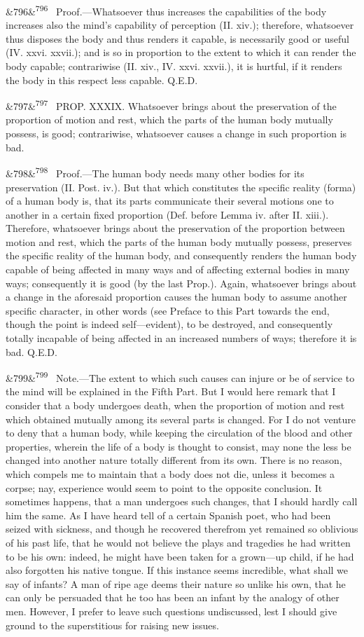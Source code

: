 \documentclass[12pt]{article}
\newcommand{\para}[1][]{\par\noindent\ifx&#1&\else\textsuperscript{\footnotesize #1}~\fi}
\begin{document}
\para[796] Proof.---Whatsoever thus increases the capabilities of the body increases also the mind's capability of perception (II. xiv.); therefore, whatsoever thus disposes the body and thus renders it capable, is necessarily good or useful (IV. xxvi. xxvii.); and is so in proportion to the extent to which it can render the body capable; contrariwise (II. xiv., IV. xxvi. xxvii.), it is hurtful, if it renders the body in this respect less capable. Q.E.D.

\para[797] PROP. XXXIX. Whatsoever brings about the preservation of the proportion of motion and rest, which the parts of the human body mutually possess, is good; contrariwise, whatsoever causes a change in such proportion is bad.

\para[798] Proof.---The human body needs many other bodies for its preservation (II. Post. iv.). But that which constitutes the specific reality (forma) of a human body is, that its parts communicate their several motions one to another in a certain fixed proportion (Def. before Lemma iv. after II. xiii.). Therefore, whatsoever brings about the preservation of the proportion between motion and rest, which the parts of the human body mutually possess, preserves the specific reality of the human body, and consequently renders the human body capable of being affected in many ways and of affecting external bodies in many ways; consequently it is good (by the last Prop.). Again, whatsoever brings about a change in the aforesaid proportion causes the human body to assume another specific character, in other words (see Preface to this Part towards the end, though the point is indeed self---evident), to be destroyed, and consequently totally incapable of being affected in an increased numbers of ways; therefore it is bad. Q.E.D.

\para[799] Note.---The extent to which such causes can injure or be of service to the mind will be explained in the Fifth Part. But I would here remark that I consider that a body undergoes death, when the proportion of motion and rest which obtained mutually among its several parts is changed. For I do not venture to deny that a human body, while keeping the circulation of the blood and other properties, wherein the life of a body is thought to consist, may none the less be changed into another nature totally different from its own. There is no reason, which compels me to maintain that a body does not die, unless it becomes a corpse; nay, experience would seem to point to the opposite conclusion. It sometimes happens, that a man undergoes such changes, that I should hardly call him the same. As I have heard tell of a certain Spanish poet, who had been seized with sickness, and though he recovered therefrom yet remained so oblivious of his past life, that he would not believe the plays and tragedies he had written to be his own: indeed, he might have been taken for a grown---up child, if he had also forgotten his native tongue. If this instance seems incredible, what shall we say of infants? A man of ripe age deems their nature so unlike his own, that he can only be persuaded that he too has been an infant by the analogy of other men. However, I prefer to leave such questions undiscussed, lest I should give ground to the superstitious for raising new issues.
\end{document}
